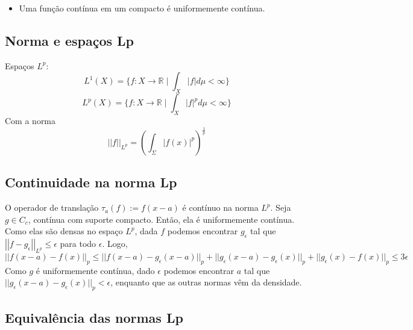 \documentclass[11pt]{article}
\newcommand{\R}{\mathbb{R}}
\newcommand{\e}{\epsilon}
\newcommand{\norm}[2]{\left|\left|#1\right|\right|_{L^{#2}}}
\newcommand{\nor}[2]{||#1||_{#2}}
\begin{document}
\begin{itemize}
	\item Uma função contínua em um compacto é uniformemente contínua.
\end{itemize}


\subsection{Norma e espaços Lp}

Espaços \( L^p: \)
\[ L^1(X) = \{ f:X\rightarrow\R \mid \int_X |f| d\mu < \infty \} \]
\[ L^p(X) = \{ f:X\rightarrow\R \mid \int_X |f|^p d\mu < \infty \} \]
Com a norma \[ \norm{f}{p} = \left(\int_\Sigma | f(x) |^p\right) ^{\frac{1}{p}}\]


\subsection{Continuidade na norma Lp}

O operador de translação \(\tau_a(f) := f(x-a)\) é contínuo na norma \(L^p\). Seja \(g \in C_c\), contínua com suporte compacto. Então, ela é uniformemente contínua. Como elas são densas no espaço \(L^p\), dada \(f\) podemos encontrar \(g_\e\) tal que \(\norm{f - g_\e}{p} \leq \e\) para todo \(\e\). Logo,
\[\nor{f(x-a) - f(x)}{p} \leq \nor{f(x-a) - g_\e(x-a)}{p} + \nor{g_\e(x-a) - g_\e(x)}{p} + \nor{g_\e(x) - f(x)}{p} \leq 3\e\]
Como \(g\) é uniformemente contínua, dado \(\e\) podemos encontrar \(a\) tal que \(\nor{g_\e(x-a) - g_\e(x)}{p} < \e\), enquanto que as outras normas vêm da densidade.

\subsection{Equivalência das normas Lp}\label{subsec:lp-equivalencia}

\begin{center}
\end{center}
\end{document}
